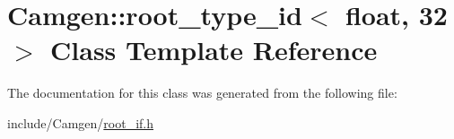 \hypertarget{a00485}{}\section{Camgen\+:\+:root\+\_\+type\+\_\+id$<$ float, 32 $>$ Class Template Reference}
\label{a00485}


The documentation for this class was generated from the following file\+:\begin{DoxyCompactItemize}
\item 
include/\+Camgen/\hyperlink{a00760}{root\+\_\+if.\+h}\end{DoxyCompactItemize}
